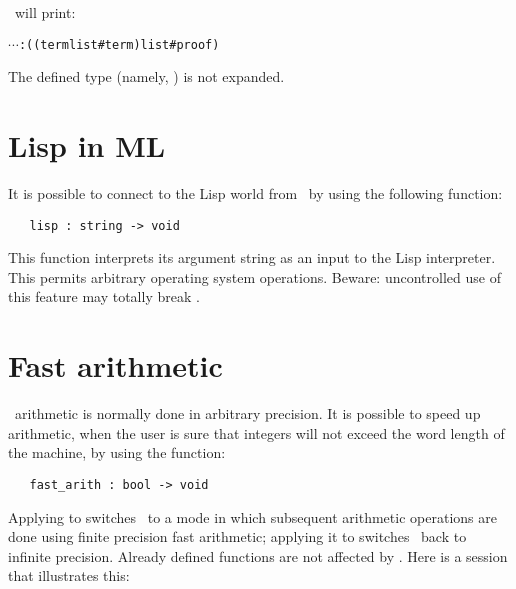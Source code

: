 \noindent\ML\ will print:


\begin{hol}\begin{alltt}
   \(\cdots\) : ((term list # term) list # proof)
\end{alltt}\end{hol}

\noindent The defined type  (namely, ) is not expanded.



\section{Lisp in ML}

It is  possible to connect
 to the  Lisp world  from \ML\  by
 using the following function:

\begin{boxed}
\begin{verbatim}
   lisp : string -> void
\end{verbatim}\end{boxed}

This function interprets its argument string as an input to the Lisp interpreter.
This permits arbitrary operating system operations. Beware: uncontrolled
use of this feature may totally break \ML.

\section{Fast arithmetic}

\ML\ arithmetic 
 is normally done in arbitrary precision.
It is possible to speed
up arithmetic, when the user is sure that integers will not exceed the
word length of the machine, by using the function:

\begin{boxed}
\begin{verbatim}
   fast_arith : bool -> void
\end{verbatim}\end{boxed}

Applying  to  switches \HOL\ to 
a mode in which subsequent
arithmetic operations are done using
finite precision fast arithmetic; applying it
to  switches \HOL\ back to infinite 
precision. Already defined functions are
not affected by . Here is a session that illustrates this:

